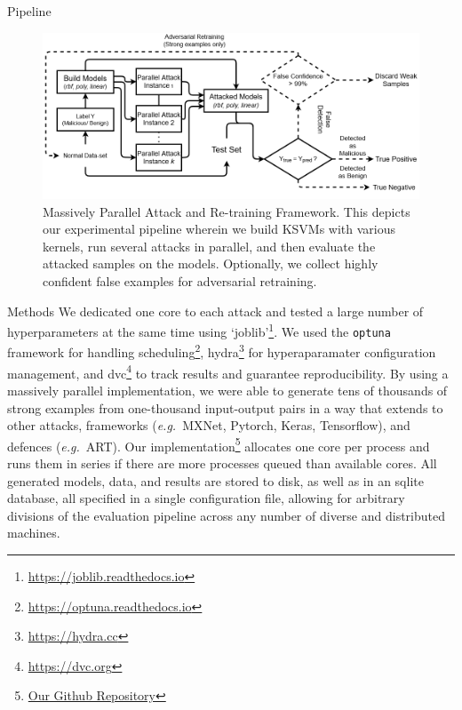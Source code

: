 \documentclass{beamer}
\begin{document}
\begin{frame}{Pipeline}
  \begin{figure}
\centering
\includegraphics[width=\textwidth]{./generated/PPGD.png}

\label{fig:attack_framework}
\caption{Massively Parallel Attack and Re-training Framework.  This depicts our experimental pipeline wherein we build KSVMs with various kernels, run several attacks in parallel, and then evaluate the attacked samples on the models. Optionally, we collect highly confident false examples for adversarial retraining.}
\end{figure}
\end{frame}

\begin{frame}{Methods}
\small
We dedicated one core to each attack and tested a large number of hyperparameters at the same time using `joblib'\footnote{\href{https://joblib.readthedocs.io}{https://joblib.readthedocs.io}}. We used the \texttt{optuna}~\cite{optuna} framework for handling scheduling\footnote{\href{https://optuna.readthedocs.io}{https://optuna.readthedocs.io}}, hydra\footnote{\href{https://hydra.cc}{https://hydra.cc}} for hyperaparamater configuration management, and dvc\footnote{\href{https://dvc.org}{https://dvc.org}} to track results and guarantee reproducibility.
  By using a massively parallel \cite{optuna} implementation, we were able to generate tens of thousands of strong examples from one-thousand input-output pairs in a way that extends to other attacks, frameworks (\textit{e.g.}~MXNet, Pytorch, Keras, Tensorflow), and defences (\textit{e.g.}~ART). Our implementation\footnote{\href{https://github.com/simplymathematics/deckard}{Our Github Repository}} allocates one core per process and runs them in series if there are more processes queued than available cores. All generated models, data, and results are stored to disk, as well as in an sqlite database, all specified in a single configuration file, allowing for arbitrary divisions of the evaluation pipeline across any number of diverse and distributed machines.
\end{frame}
\end{document}
